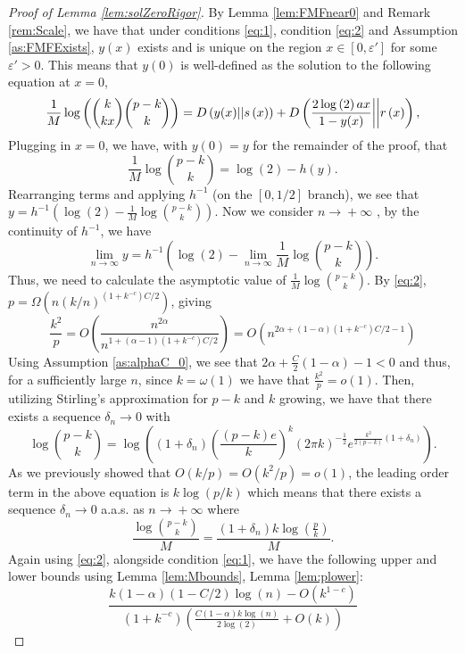 \documentclass[12pt,reqno]{amsart}
\numberwithin{equation}{section}
\theoremstyle{definition}
\renewcommand{\epsilon}{\varepsilon}
\newcommand{\conv}[1]{\overset{#1}{\rightarrow}}
\renewcommand{\[}{\begin{equation}}
\renewcommand{\]}{\end{equation}}
\renewcommand{\|}{\bigg{|}}
\newcommand{\ngrow}{\ensuremath{n \conv{} +\infty} }
\newcommand{\err}{c}
\begin{document}
\begin{proof}[Proof of Lemma \ref{lem:solZeroRigor}]
    By Lemma \ref{lem:FMFnear0} and Remark \ref{rem:Scale}, we have that under conditions \eqref{eq:1}, condition \eqref{eq:2} and Assumption \ref{as:FMFExists}, $y(x)$ exists and is unique on the region $x \in [0,\epsilon']$ for some $\epsilon' > 0$. This means that $y(0)$ is well-defined as the solution to the following equation at $x = 0$,
    \[\frac{1}{M}\log \left(\binom{k}{kx}\binom{p-k}{k}\right) =  D \left( y(x) || s \left( x \right)\right) +  D \left(\frac{2\log \left(2\right) a  x }{1 -  y(x) }\|\| r \left( x \right)\right),\label{eq:FMF:zeroSetup}\]
    Plugging in $x = 0$, we have, with $y(0) = y$ for the remainder of the proof, that        
         \[\frac{1}{M}\log\binom{p-k}{k} = \log(2) - h(y).\]
         Rearranging terms and applying $h^{-1}$ (on the $[0,1/2]$ branch), we see that $y = h^{-1}\left(\log(2) - \frac{1}{M}\log\binom{p-k}{k}\right)$. Now we consider \ngrow\!, by the continuity of $h^{-1}$, we have
         \[\lim_{n \conv{} \infty} y = h^{-1}\left(\log(2) - \lim_{n \conv{} \infty}\frac{1}{M}\log\binom{p-k}{k}\right).\label{eq:zeroSol:setup}\]
         Thus, we need to calculate the asymptotic value of $\frac{1}{M}\log\binom{p-k}{k}$. By \eqref{eq:2}, $p = \Omega\left(n(k/n)^{(1+k^{-\err})C/2}\right)$, giving
         \[\frac{k^2}{p} = O\left(\frac{n^{2\alpha}}{n^{1+(\alpha-1)(1+k^{-\err})C/2}}\right) = O\left(n^{2\alpha + (1-\alpha)(1+k^{-\err})C/2 - 1}\right)\]
         Using Assumption \ref{as:alphaC_0}, we see that $2\alpha + \frac{C}{2}(1-\alpha) - 1 < 0$ and thus, for a sufficiently large $n$, since $k=\omega(1)$ we have that $\frac{k^2}{p} = o(1)$. Then, utilizing Stirling's approximation for $p-k$ and $k$ growing, we have that there exists a sequence $\delta_n \conv{} 0$ with
            \[\log\binom{p-k}{k} = \log\left((1+\delta_n)\left(\frac{(p-k)e}{k}\right)^{ k }\left(2\pi  k \right)^{ - \frac{1}{2}} e ^{\frac{ k ^{2}}{2 (p-k) }\left(1 + \delta_n\right)}\right).\]
         As we previously showed that $O(k/p) = O(k^2/p) = o(1)$, the leading order term in the above equation is $k\log(p/k)$ which means that there exists a sequence $\delta_n \conv{} 0$ a.a.s. as \ngrow where
         \[\frac{\log\binom{p-k}{k}}{M} = \frac{(1+\delta_n)k\log\left(\frac{p}{k}\right)}{M}.\label{eq:stir1}\]
        Again using \eqref{eq:2}, alongside condition \eqref{eq:1}, we have the following upper and lower bounds using Lemma \ref{lem:Mbounds}, Lemma \ref{lem:plower}:
        \[\frac{k(1-\alpha)(1-C/2)\log(n) - O(k^{1-\err})}{(1+ k^{-\err})\left(\frac{C(1-\alpha)k\log(n)}{2\log(2)} + O(k)\right)} 
\]
\end{proof}
\end{document}
